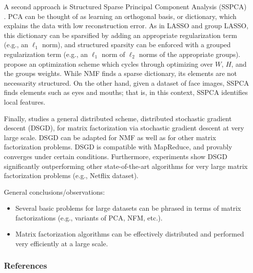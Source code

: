 \documentclass{article} %
\begin{document}
A second approach is Structured Sparse Principal Component Analysis (SSPCA)
\cite{jenatton10structuredsparsePCA}. PCA can be thought of as learning an
orthogonal basis, or dictionary, which explains the data with low
reconstruction error. As in LASSO and group LASSO, this dictionary can be
sparsified by adding an appropriate regularization term (e.g., an $\ell_1$
norm), and structured sparsity can be enforced with a grouped regularization
term (e.g., an $\ell_1$ norm of $\ell_2$ norms of the appropriate groups).
\cite{jenatton10structuredsparsePCA} propose an optimization scheme which
cycles through optimizing over $W$, $H$, and the groups weights.
While NMF finds a sparse dictionary, its elements are not necessarity
structured. On the other hand, given a dataset of face images, SSPCA finds
elements such as eyes and mouths; that is, in this context, SSPCA identifies
local features.

Finally, \cite{gemulla11matrixfactorization} studies a general distributed
scheme, distributed stochastic gradient descent (DSGD), for matrix
factorization via stochastic gradient descent at very large scale. DSGD can be
adapted for NMF as well as for other matrix factorization problems. DSGD is
compatible with MapReduce, and provably converges under certain conditions.
Furthermore, experiments show DSGD significantly outperforming other
state-of-the-art algorithms for very large matrix factorization problems (e.g.,
Netflix dataset).

General conclusions/observations:
\begin{itemize}
\item Several basic problems for large datasets can be phrased in terms of
matrix factorizations (e.g., variants of PCA, NFM, etc.).
\item Matrix factorization algorithms can be effectively distributed and
performed very efficiently at a large scale.
\end{itemize}

\subsubsection*{References}
\setlength{\bibsep}{0.0pt}
{


}
\end{document}
